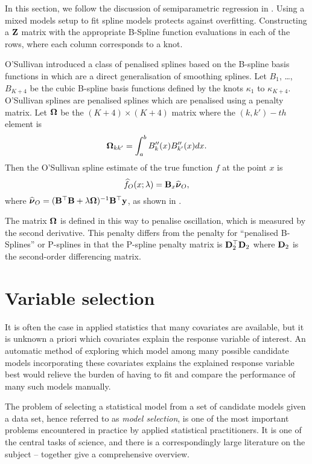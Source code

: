 In this section, we follow the discussion of semiparametric regression in
\cite{ruppert_wand_carroll_2003}.  Using a mixed models setup to fit spline
models protects against overfitting. Constructing a ${\bf Z}$ matrix with the
appropriate B-Spline function evaluations in each of the rows, where each column
corresponds to a knot.

O'Sullivan introduced a class of penalised splines based on the B-spline basis
functions in \cite{OSullivan1986} which are a direct generalisation of smoothing
splines. Let $B_1$, \ldots, $B_{K+4}$ be the cubic B-spline basis functions
defined by the knots $\kappa_1$ to $\kappa_{K+4}$. O'Sullivan splines are
penalised splines which are penalised using a penalty matrix. Let ${\boldsymbol \Omega}$ be
the $(K+4) \times (K+4)$ matrix where the $(k, k')-th$ element is \[
{\boldsymbol \Omega}_{k k'} = \int_a^b B''_k(x) B''_{k'}(x) dx. \] Then the O'Sullivan spline
estimate of the true function $f$ at the point $x$ is \begin{equation*}
\widehat{f}_O(x; \lambda) = {\bf B}_x \widehat{{\boldsymbol \nu}}_O, \end{equation*} where
$\widehat{{\boldsymbol \nu}}_O = ({\bf B}^\top {\bf B} + \lambda {\boldsymbol\Omega})^{-1} {\bf B}^\top {\bf y}$, as
shown in \cite{ruppert_wand_carroll_2003}.

The matrix ${\boldsymbol \Omega}$ is defined in this way to penalise oscillation, which is
measured by the second derivative. This penalty differs from the penalty for
``penalised B-Splines'' or P-splines in that the P-spline penalty matrix is
${\bf D}_2^\top {\bf D}_2$ where ${\bf D}_2$ is the second-order differencing matrix.

\section{Variable selection}

It is often the case in applied statistics that many covariates are available,
but it is unknown a priori which covariates explain the response variable of
interest. An automatic method of exploring which model among many possible
candidate models incorporating these covariates explains the explained response
variable best would relieve the burden of having to fit and compare the
performance of many such models manually.

The problem of selecting a statistical model from a set of candidate models
given a data set, hence referred to as \emph{model selection}, is one of the
most important problems encountered in practice by applied statistical
practitioners. It is one of the central tasks of science, and there is a
correspondingly large literature on the subject -- \cite{Claeskens:1251912,
NengjunYi2013, Johnstone2009} together give a comprehensive overview.

